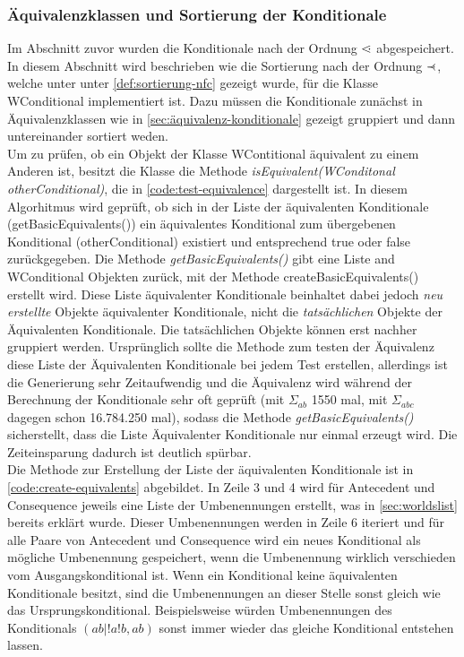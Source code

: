 \documentclass[12pt,a4paper]{article}
\newcommand\dotl{\mathrel{%
    \mathchoice{\QEQ}{\QEQ}{\QEQ}{\QEQ}%
}}
\def\QEQ{{%
    \setbox0\hbox{<}%
    \rlap{\hbox to \wd0{\hss \raisebox {0.1pt}{$\ \cdot$\hss}}}\box0
}}
\newcommand\rdotl{\mathrel{%
    \mathchoice{\RQEQ}{\RQEQ}{\RQEQ}{\RQEQ}%
}}
\def\RQEQ{{%
    \setbox0\hbox{$\prec$}%
    \rlap{\hbox to \wd0{\hss \raisebox {0.01pt}{$\ \cdot$\hss}}}\box0
}}
\begin{document}
\subsubsection{Äquivalenzklassen und Sortierung der Konditionale}

\label{sec:equivalence}

Im Abschnitt zuvor wurden die Konditionale nach der Ordnung $\dotl$ abgespeichert. In diesem Abschnitt wird beschrieben wie die Sortierung nach der Ordnung $\rdotl$, welche unter unter \autoref{def:sortierung-nfc} gezeigt wurde, für die Klasse WConditional implementiert ist. Dazu müssen die Konditionale zunächst in Äquivalenzklassen wie in \autoref{sec:äquivalenz-konditionale} gezeigt gruppiert und dann untereinander sortiert weden. \\
Um zu prüfen, ob ein Objekt der Klasse WContitional äquivalent zu einem Anderen ist, besitzt die Klasse die Methode \textit{isEquivalent(WConditonal otherConditional)}, die in \autoref{code:test-equivalence} dargestellt ist. In diesem Algorhitmus wird geprüft, ob sich in der Liste der äquivalenten Konditionale (getBasicEquivalents()) ein äquivalentes Konditional zum übergebenen Konditional (otherConditional) existiert und entsprechend true oder false zurückgegeben. Die Methode \textit{getBasicEquivalents()} gibt eine Liste and WConditional Objekten zurück, mit der Methode createBasicEquivalents() erstellt wird. Diese Liste äquivalenter Konditionale beinhaltet dabei jedoch \textit{neu erstellte} Objekte äquivalenter Konditionale, nicht die \textit{tatsächlichen} Objekte der Äquivalenten Konditionale. Die tatsächlichen Objekte können erst nachher gruppiert werden. Ursprünglich sollte die Methode zum testen der Äquivalenz diese Liste der Äquivalenten Konditionale bei jedem Test erstellen, allerdings ist die Generierung sehr Zeitaufwendig und die Äquivalenz wird während der Berechnung der Konditionale sehr oft geprüft (mit $\Sigma_{ab}$ 1550 mal, mit $\Sigma_{abc}$ dagegen schon 16.784.250 mal), sodass die Methode \textit{getBasicEquivalents()} sicherstellt, dass die Liste Äquivalenter Konditionale nur einmal erzeugt wird. Die Zeiteinsparung dadurch ist deutlich spürbar.\\ 
Die Methode zur Erstellung der Liste der äquivalenten Konditionale ist in \autoref{code:create-equivalents} abgebildet. In Zeile 3 und 4 wird für Antecedent und Consequence jeweils eine Liste der Umbenennungen erstellt, was in \autoref{sec:worldslist} bereits erklärt wurde. Dieser Umbenennungen werden in Zeile 6 iteriert und für alle Paare von Antecedent und Consequence wird ein neues Konditional als mögliche Umbenennung gespeichert, wenn die Umbenennung wirklich verschieden vom Ausgangskonditional ist. Wenn ein Konditional keine äquivalenten Konditionale besitzt, sind die Umbenennungen an dieser Stelle sonst gleich wie das Ursprungskonditional. Beispielsweise würden Umbenennungen des Konditionals $(ab|!a!b,ab)$ sonst immer wieder das gleiche Konditional entstehen lassen.
\end{document}
